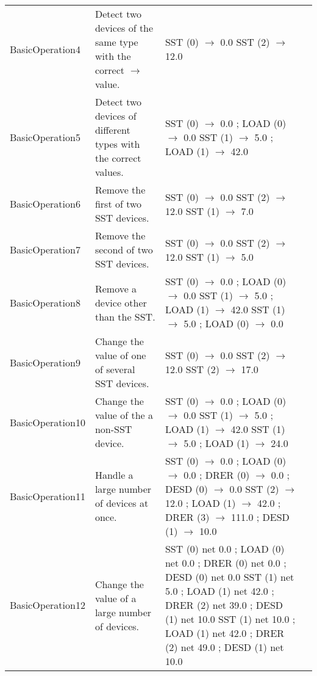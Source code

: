 \documentclass{article}
\begin{document}
\begin{center}
\begin{footnotesize}
\begin{longtable}{|p{3cm}|p{4cm}|p{10cm}|c|}
    BasicOperation4 & Detect two devices of the same type with the correct $\rightarrow$ value. & SST (0) $\rightarrow$ 0.0 \newline SST (2) $\rightarrow$ 12.0 & \\
    BasicOperation5 & Detect two devices of different types with the correct values. & SST (0) $\rightarrow$ 0.0 ; LOAD (0) $\rightarrow$ 0.0 \newline SST (1) $\rightarrow$ 5.0 ; LOAD (1) $\rightarrow$ 42.0 & \\
    BasicOperation6 & Remove the first of two SST devices. & SST (0) $\rightarrow$ 0.0 \newline SST (2) $\rightarrow$ 12.0 \newline SST (1) $\rightarrow$ 7.0 & \\
    BasicOperation7 & Remove the second of two SST devices. & SST (0) $\rightarrow$ 0.0 \newline SST (2) $\rightarrow$ 12.0 \newline SST (1) $\rightarrow$ 5.0 & \\
    BasicOperation8 & Remove a device other than the SST. & SST (0) $\rightarrow$ 0.0 ; LOAD (0) $\rightarrow$ 0.0 \newline SST (1) $\rightarrow$ 5.0 ; LOAD (1) $\rightarrow$ 42.0 \newline SST (1) $\rightarrow$ 5.0 ; LOAD (0) $\rightarrow$ 0.0 & \\
    BasicOperation9 & Change the value of one of several SST devices. & SST (0) $\rightarrow$ 0.0 \newline SST (2) $\rightarrow$ 12.0 \newline SST (2) $\rightarrow$ 17.0 & \\
    BasicOperation10 & Change the value of the a non-SST device. & SST (0) $\rightarrow$ 0.0 ; LOAD (0) $\rightarrow$ 0.0 \newline SST (1) $\rightarrow$ 5.0 ; LOAD (1) $\rightarrow$ 42.0 \newline SST (1) $\rightarrow$ 5.0 ; LOAD (1) $\rightarrow$ 24.0 & \\
    BasicOperation11 & Handle a large number of devices at once. &  SST (0) $\rightarrow$ 0.0 ; LOAD (0) $\rightarrow$ 0.0 ; DRER (0) $\rightarrow$ 0.0 ; DESD (0) $\rightarrow$ 0.0 \newline SST (2) $\rightarrow$ 12.0 ; LOAD (1) $\rightarrow$ 42.0 ; DRER (3) $\rightarrow$ 111.0 ; DESD (1) $\rightarrow$ 10.0 & \\
    BasicOperation12 & Change the value of a large number of devices. & SST (0) net 0.0 ; LOAD (0) net 0.0 ; DRER (0) net 0.0 ; DESD (0) net 0.0 \newline SST (1) net 5.0 ; LOAD (1) net 42.0 ; DRER (2) net 39.0 ; DESD (1) net 10.0 \newline SST (1) net 10.0 ; LOAD (1) net 42.0 ; DRER (2) net 49.0 ; DESD (1) net 10.0 & \\

\end{longtable}
\end{footnotesize}
\end{center}
\end{document}
